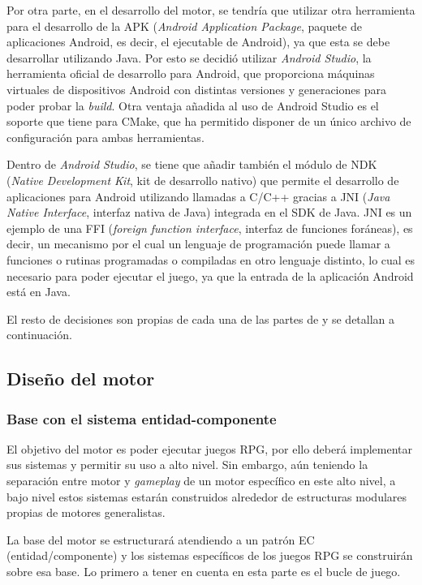 \medskip

Por otra parte, en el desarrollo del motor, se tendría que utilizar otra herramienta para el desarrollo de la APK (\textit{Android Application Package}, paquete de aplicaciones Android, es decir, el ejecutable de Android), ya que esta se debe desarrollar utilizando Java. Por esto se decidió utilizar \textit{Android Studio}, la herramienta oficial de desarrollo para Android, que proporciona máquinas virtuales de dispositivos Android con distintas versiones y generaciones para poder probar la \textit{build}. Otra ventaja añadida al uso de Android Studio es el soporte que tiene para CMake, que ha permitido disponer de un único archivo de configuración para ambas herramientas.

\smallskip

Dentro de \textit{Android Studio}, se tiene que añadir también el módulo de NDK (\textit{Native Development Kit}, kit de desarrollo nativo) que permite el desarrollo de aplicaciones para Android utilizando llamadas a C/C++ gracias a JNI (\textit{Java Native Interface}, interfaz nativa de Java) integrada en el SDK de Java. JNI es un ejemplo de una FFI (\textit{foreign function interface}, interfaz de funciones foráneas), es decir, un mecanismo por el cual un lenguaje de programación puede llamar a funciones o rutinas programadas o compiladas en otro lenguaje distinto, lo cual es necesario para poder ejecutar el juego, ya que la entrada de la aplicación Android está en Java.

\medskip

El resto de decisiones son propias de cada una de las partes de \baker{} y se detallan a continuación.

\subsection{Diseño del motor}
\subsubsection{Base con el sistema entidad-componente}
El objetivo del motor es poder ejecutar juegos RPG, por ello deberá implementar sus sistemas y permitir su uso a alto nivel. Sin embargo, aún teniendo la separación entre motor y \textit{gameplay} de un motor específico en este alto nivel, a bajo nivel estos sistemas estarán construidos alrededor de estructuras modulares propias de motores generalistas.

\medskip  

La base del motor se estructurará atendiendo a un patrón EC (entidad/componente) y los sistemas específicos de los juegos RPG se construirán sobre esa base. Lo primero a tener en cuenta en esta parte es el bucle de juego.

